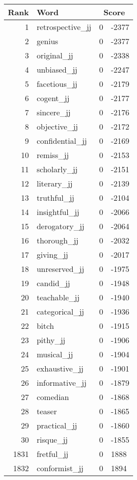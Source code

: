 \begin{longtable}[!htbp]{| rlr@{.}l |}
    \hline
    \textbf{Rank} & \textbf{Word} & \multicolumn{2}{c|}{\textbf{Score}} \\
    \hline
    \endhead
    1 & retrospective\_jj & 0 & -2377 \\
    2 & genius & 0 & -2377 \\
    3 & original\_jj & 0 & -2338 \\
    4 & unbiased\_jj & 0 & -2247 \\
    5 & facetious\_jj & 0 & -2179 \\
    6 & cogent\_jj & 0 & -2177 \\
    7 & sincere\_jj & 0 & -2176 \\
    8 & objective\_jj & 0 & -2172 \\
    9 & confidential\_jj & 0 & -2169 \\
    10 & remiss\_jj & 0 & -2153 \\
    11 & scholarly\_jj & 0 & -2151 \\
    12 & literary\_jj & 0 & -2139 \\
    13 & truthful\_jj & 0 & -2104 \\
    14 & insightful\_jj & 0 & -2066 \\
    15 & derogatory\_jj & 0 & -2064 \\
    16 & thorough\_jj & 0 & -2032 \\
    17 & giving\_jj & 0 & -2017 \\
    18 & unreserved\_jj & 0 & -1975 \\
    19 & candid\_jj & 0 & -1948 \\
    20 & teachable\_jj & 0 & -1940 \\
    21 & categorical\_jj & 0 & -1936 \\
    22 & bitch & 0 & -1915 \\
    23 & pithy\_jj & 0 & -1906 \\
    24 & musical\_jj & 0 & -1904 \\
    25 & exhaustive\_jj & 0 & -1901 \\
    26 & informative\_jj & 0 & -1879 \\
    27 & comedian & 0 & -1868 \\
    28 & teaser & 0 & -1865 \\
    29 & practical\_jj & 0 & -1860 \\
    30 & risque\_jj & 0 & -1855 \\
    1831 & fretful\_jj & 0 & 1888 \\
    1832 & conformist\_jj & 0 & 1894 \\

\end{longtable}
